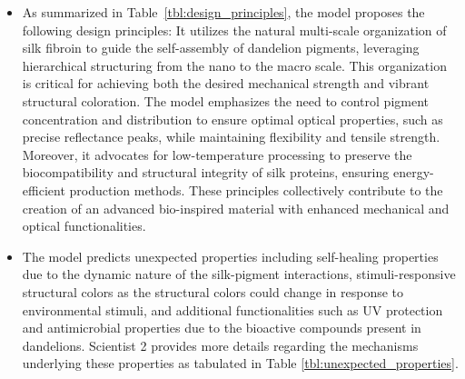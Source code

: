 \documentclass{article}
\begin{document}
\begin{itemize}
\item As summarized in Table~\ref{tbl:design_principles}, the model proposes the following design principles: It utilizes the natural multi-scale organization of silk fibroin to guide the self-assembly of dandelion pigments, leveraging hierarchical structuring from the nano to the macro scale. This organization is critical for achieving both the desired mechanical strength and vibrant structural coloration. The model emphasizes the need to control pigment concentration and distribution to ensure optimal optical properties, such as precise reflectance peaks, while maintaining flexibility and tensile strength. Moreover, it advocates for low-temperature processing to preserve the biocompatibility and structural integrity of silk proteins, ensuring energy-efficient production methods. These principles collectively contribute to the creation of an advanced bio-inspired material with enhanced mechanical and optical functionalities.

\item The model predicts unexpected properties including self-healing properties due to the dynamic nature of the silk-pigment interactions, stimuli-responsive structural colors as the structural colors could change in response to environmental stimuli, and additional functionalities such as UV protection and antimicrobial properties due to the bioactive compounds present in dandelions. Scientist 2 provides more details regarding the mechanisms underlying these properties as tabulated in Table \ref{tbl:unexpected_properties}.
\end{itemize}
\end{document}
